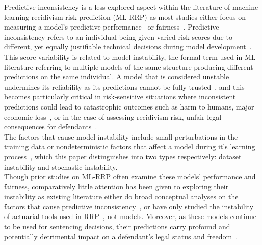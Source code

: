 \documentclass[12pt]{article}
\begin{document}
Predictive inconsistency is a less explored aspect within the literature of machine learning recidivism risk prediction (ML-RRP) as most studies either focus on measuring a model's predictive performance~\cite{duwe2017out, travaini2022machine, tollenaar2013method} or fairness~\cite{tolan2019machine, dressel2018accuracy, ngo2018traditional}. Predictive inconsistency refers to an individual being given varied risk scores due to different, yet equally justifiable technical decisions during model development~\cite{greene2022forks}. This score variability is related to model instability, the formal term used in ML literature referring to multiple models of the same structure producing different predictions on the same individual. A model that is considered unstable undermines its reliability as its predictions cannot be fully trusted~\cite{riley2023stability}, and this becomes particularly critical in risk-sensitive situations where inconsistent predictions could lead to catastrophic outcomes such as harm to humans, major economic loss~\cite{zhang2024reliability}, or in the case of assessing recidivism risk, unfair legal consequences for defendants~\cite{greene2022forks}. \\

The factors that cause model instability include small perturbations in the training data or nondeterministic factors that affect a model during it's learning process~\cite{riley2023stability, lopez2022instability}, which this paper distinguishes into two types respectively: dataset instability and stochastic instability.\\

Though prior studies on ML-RRP often examine these models' performance and fairness, comparatively little attention has been given to exploring their instability as existing literature either do broad conceptual analyses on the factors that cause predictive inconsistency~\cite{greene2022forks}, or have only studied the instability of actuarial tools used in RRP~\cite{helmus2015stability}, not models. Moreover, as these models continue to be used for sentencing decisions, their predictions carry profound and potentially detrimental impact on a defendant's legal status and freedom~\cite{van2022predicting}. \\
\end{document}
